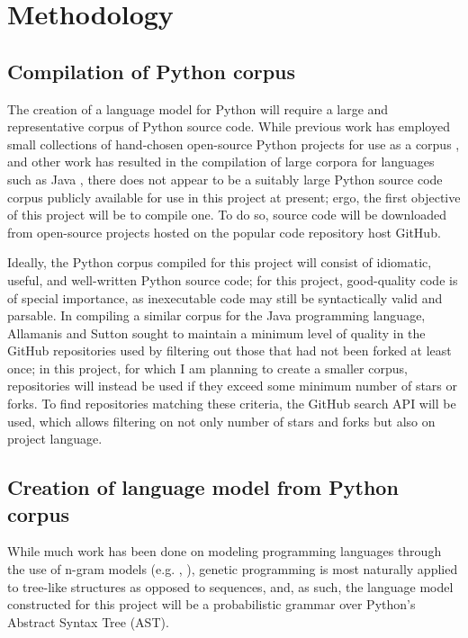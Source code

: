 \documentclass[a4paper,11pt]{proposal}
\begin{document}
\section{Methodology} \label{sec:disc}

\subsection{Compilation of Python corpus}
The creation of a language model for Python will require a large and representative corpus of Python source code. While previous work has employed small collections of hand-chosen open-source Python projects for use as a corpus \cite{tu2014} \cite{caliskan2015}, and other work has resulted in the compilation of large corpora for languages such as Java \cite{allamanis2013}, there does not appear to be a suitably large Python source code corpus publicly available for use in this project at present; ergo, the first objective of this project will be to compile one. To do so, source code will be downloaded from open-source projects hosted on the popular code repository host GitHub. 

Ideally, the Python corpus compiled for this project will consist of idiomatic, useful, and well-written Python source code; for this project, good-quality code is of special importance, as inexecutable code may still be syntactically valid and parsable. In compiling a similar corpus for the Java programming language, Allamanis and Sutton \cite{allamanis2013} sought to maintain a minimum level of quality in the GitHub repositories used by filtering out those that had not been forked at least once; in this project, for which I am planning to create a smaller corpus, repositories will instead be used if they exceed some minimum number of stars or forks. To find repositories matching these criteria, the GitHub search API will be used, which allows filtering on not only number of stars and forks but also on project language.

\subsection{Creation of language model from Python corpus}

While much work has been done on modeling programming languages through the use of n-gram models (e.g. \cite{hindle2012}, \cite{allamanis2013}), genetic programming is most naturally applied to tree-like structures as opposed to sequences, and, as such, the language model constructed for this project will be a probabilistic grammar over Python's Abstract Syntax Tree (AST).
\end{document}

